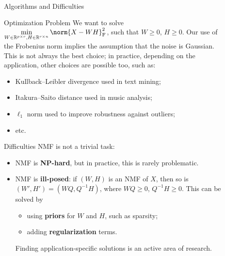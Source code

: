 \documentclass[final]{beamer}
\newlength{\sepwid}
\newlength{\onecolwid}
\newlength{\threecolwid}
\begin{document}
\begin{frame}
\begin{columns}[t]
\begin{column}{\threecolwid}
\end{column}
\begin{column}{\sepwid}
\end{column} %
\begin{column}{\onecolwid}
\begin{columns}[t]
\begin{column}{\onecolwid} %
\begin{exampleblock}{Algorithms and Difficulties}
\begin{block}{Optimization Problem}
We want to solve \(\displaystyle \min_{W \in \mathbb{R}^{p \times r}, H \in \mathbb{R}^{r \times n}} \norm{X - WH}^2_{\textnormal{F}}\), such that \(W \geqslant 0\), \(H \geqslant 0\).
Our use of the Frobenius norm implies the assumption that the noise is Gaussian.
This is not always the best choice; in practice, depending on the application, other choices are possible too, such as:
\begin{itemize}
    \item Kullback--Leibler divergence used in text mining;
    \item Itakura--Saito distance used in music analysis;
    \item \(\ell_1\) norm used to improve robustness against outliers;
    \item etc.
\end{itemize}
\end{block}
\begin{block}{Difficulties}
NMF is not a trivial task:
\begin{itemize}
    \item NMF is \textbf{NP-hard}, but in practice, this is rarely problematic.
    \item NMF is \textbf{ill-posed}: if \((W, H)\) is an NMF of \(X\), then so is \((W', H') = (WQ, Q^{-1}H)\), where \(WQ \geqslant 0\), \(Q^{-1}H \geqslant 0\).
    This can be solved by
    \begin{itemize}
        \item using \textbf{priors} for \(W\) and \(H\), such as sparsity;
        \item adding \textbf{regularization} terms.
    \end{itemize}
    Finding application-specific solutions is an active area of research.
\end{itemize}
\end{block}
\end{exampleblock}



\end{column}
\end{columns}
\end{column}
\end{columns}
\end{frame}
\end{document}
